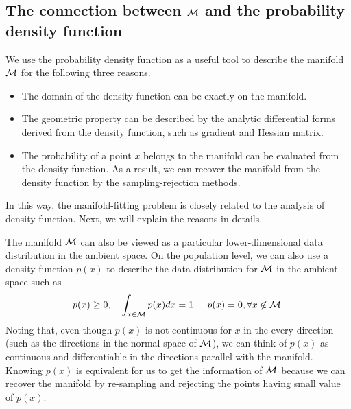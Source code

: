 \documentclass[aos,preprint]{imsart}
\theoremstyle{remark}
\begin{document}
\subsection{The connection between $\cal M$ and the probability density function}
We use the probability density function as a useful tool to describe the manifold $\cal M$ for the following three reasons.
\begin{itemize}
\item The domain of the density function can be exactly on the manifold. 
\item The geometric property can be described by the analytic differential forms derived from the density function, such as gradient and Hessian matrix.
\item The probability of a point $x$ belongs to the manifold can be evaluated from the density function. As a result, we can recover the manifold from the density function by the sampling-rejection methods.
\end{itemize}
In this way, the manifold-fitting problem is closely related to the analysis of density function. Next, we will explain the reasons in details.

The manifold $\cal M$ can also be viewed as a particular lower-dimensional data distribution in the ambient space. On the population level, we can also use a density function $p(x)$ to describe the data distribution for $\cal M$ in the ambient space such as
\[
p(x)\geq 0,\quad  \int_{x\in \cal M} p(x)dx=1, \quad p(x) = 0, \forall x\not \in \cal M.
\] Noting that, even though $p(x)$ is not continuous for $x$ in the every direction (such as the directions in the normal space of $\cal M$), we can think of $p(x)$ as continuous and differentiable in the directions parallel with the manifold. Knowing $p(x)$ is equivalent for us to get the information of $\cal M$ because we can recover the manifold by re-sampling and rejecting the points having small value of $p(x)$.
\end{document}
